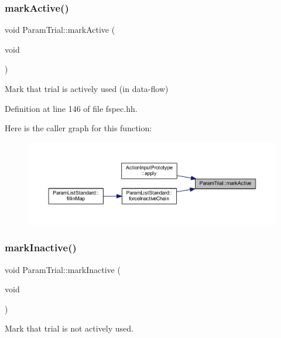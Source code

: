 \subsubsection{\texorpdfstring{markActive()}{markActive()}}
{\footnotesize\ttfamily void Param\+Trial\+::mark\+Active (\begin{DoxyParamCaption}\item[{void}]{ }\end{DoxyParamCaption})\hspace{0.3cm}{\ttfamily [inline]}}



Mark that trial is actively used (in data-\/flow) 



Definition at line 146 of file fspec.\+hh.

Here is the caller graph for this function\+:
\nopagebreak
\begin{figure}[H]
\begin{center}
\leavevmode
\includegraphics[width=350pt]{class_param_trial_aa929e7464a8b48843ba7e03f7a741e0a_icgraph}
\end{center}
\end{figure}
\mbox{\label{class_param_trial_a2739d29f090bc6f5751dd10aa6cc9a65}} 
\subsubsection{\texorpdfstring{markInactive()}{markInactive()}}
{\footnotesize\ttfamily void Param\+Trial\+::mark\+Inactive (\begin{DoxyParamCaption}\item[{void}]{ }\end{DoxyParamCaption})\hspace{0.3cm}{\ttfamily [inline]}}



Mark that trial is not actively used. 



